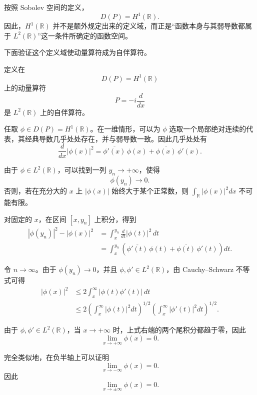 \documentclass[UTF8,a4paper,11pt,openany]{ctexbook}
\begin{document}
按照 Sobolev 空间的定义，
\begin{equation}
    D(P)=H^1(\mathbb R).
\end{equation}
因此，$H^1(\mathbb R)$ 并不是额外规定出来的定义域，而正是“函数本身与其弱导数都属于 $L^2(\mathbb R)$”这一条件所确定的函数空间。

下面验证这个定义域使动量算符成为自伴算符。

\begin{proposition}
定义在
\[
D(P)=H^1(\mathbb R)
\]
上的动量算符
\[
P=-i\frac{d}{dx}
\]
是 $L^2(\mathbb R)$ 上的自伴算符。
\end{proposition}

\begin{proofblock}
任取 $\phi\in D(P)=H^1(\mathbb R)$。在一维情形，可以为 $\phi$ 选取一个局部绝对连续的代表，其经典导数几乎处处存在，并与弱导数一致。因此几乎处处有
\begin{equation}
    \frac{d}{dx}|\phi(x)|^2
    =
    \overline{\phi'(x)}\,\phi(x)
    +
    \overline{\phi(x)}\,\phi'(x).
\end{equation}

由于 $\phi\in L^2(\mathbb R)$，可以找到一列 $y_n\to+\infty$，使得
\[
\phi(y_n)\to0.
\]
否则，若在充分大的 $x$ 上 $|\phi(x)|$ 始终大于某个正常数，则
$\int_{\mathbb R}|\phi(x)|^2dx$ 不可能有限。

对固定的 $x$，在区间 $[x,y_n]$ 上积分，得到
\begin{align}
    |\phi(y_n)|^2-|\phi(x)|^2
    &=
    \int_x^{y_n}
    \frac{d}{dt}|\phi(t)|^2\,dt
    \nonumber\\
    &=
    \int_x^{y_n}
    \left(
        \overline{\phi'(t)}\,\phi(t)
        +
        \overline{\phi(t)}\,\phi'(t)
    \right)dt.
\end{align}

令 $n\to\infty$。由于 $\phi(y_n)\to0$，并且
$\phi,\phi'\in L^2(\mathbb R)$，由 Cauchy--Schwarz 不等式可得
\begin{align}
    |\phi(x)|^2
    &\leq
    2\int_x^\infty
    |\phi(t)\phi'(t)|\,dt
    \nonumber\\
    &\leq
    2
    \left(
        \int_x^\infty|\phi(t)|^2dt
    \right)^{1/2}
    \left(
        \int_x^\infty|\phi'(t)|^2dt
    \right)^{1/2}.
\end{align}

由于 $\phi,\phi'\in L^2(\mathbb R)$，当 $x\to+\infty$ 时，上式右端的两个尾积分都趋于零，因此
\[
\lim_{x\to+\infty}\phi(x)=0.
\]

完全类似地，在负半轴上可以证明
\[
\lim_{x\to-\infty}\phi(x)=0.
\]
因此
\begin{equation}
    \boxed{
    \lim_{x\to\pm\infty}\phi(x)=0
    }.
\end{equation}


\end{proofblock}
\end{document}
